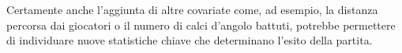 Certamente anche l'aggiunta di altre covariate come, ad esempio, la distanza percorsa dai giocatori o il numero di calci d'angolo battuti, potrebbe permettere di individuare nuove statistiche chiave che determinano l'esito della partita.\\


